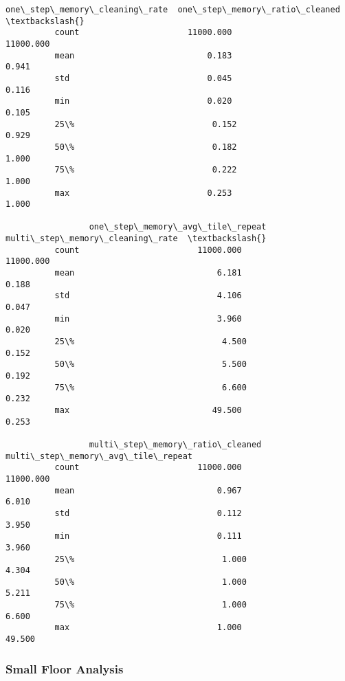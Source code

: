 \documentclass[11pt]{article}
\begin{document}
\begin{Verbatim}[commandchars=\\\{\}]
                 one\_step\_memory\_cleaning\_rate  one\_step\_memory\_ratio\_cleaned  \textbackslash{}
          count                      11000.000                      11000.000   
          mean                           0.183                          0.941   
          std                            0.045                          0.116   
          min                            0.020                          0.105   
          25\%                            0.152                          0.929   
          50\%                            0.182                          1.000   
          75\%                            0.222                          1.000   
          max                            0.253                          1.000   
          
                 one\_step\_memory\_avg\_tile\_repeat  multi\_step\_memory\_cleaning\_rate  \textbackslash{}
          count                        11000.000                        11000.000   
          mean                             6.181                            0.188   
          std                              4.106                            0.047   
          min                              3.960                            0.020   
          25\%                              4.500                            0.152   
          50\%                              5.500                            0.192   
          75\%                              6.600                            0.232   
          max                             49.500                            0.253   
          
                 multi\_step\_memory\_ratio\_cleaned  multi\_step\_memory\_avg\_tile\_repeat  
          count                        11000.000                          11000.000  
          mean                             0.967                              6.010  
          std                              0.112                              3.950  
          min                              0.111                              3.960  
          25\%                              1.000                              4.304  
          50\%                              1.000                              5.211  
          75\%                              1.000                              6.600  
          max                              1.000                             49.500  
\end{Verbatim}
            
    \subsubsection{Small Floor Analysis}
\end{document}
